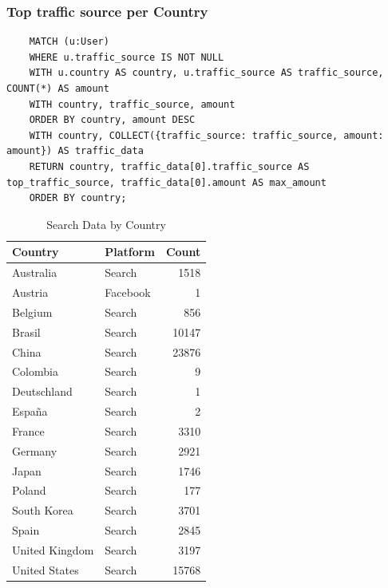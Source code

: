 \documentclass[a4paper,12pt]{article}
\begin{document}
  \subsubsection{Top traffic source per Country}
  \begin{verbatim}
    MATCH (u:User)
    WHERE u.traffic_source IS NOT NULL
    WITH u.country AS country, u.traffic_source AS traffic_source, COUNT(*) AS amount
    WITH country, traffic_source, amount
    ORDER BY country, amount DESC
    WITH country, COLLECT({traffic_source: traffic_source, amount: amount}) AS traffic_data
    RETURN country, traffic_data[0].traffic_source AS top_traffic_source, traffic_data[0].amount AS max_amount
    ORDER BY country;
  \end{verbatim}  

  \begin{table}[h!]
    \centering
    \caption{Search Data by Country}
    \label{tab:search_data}
    \begin{tabular}{l l r}
        \toprule
        \textbf{Country} & \textbf{Platform} & \textbf{Count} \\
        \midrule
        Australia       & Search & 1518 \\
        Austria         & Facebook & 1 \\
        Belgium         & Search & 856 \\
        Brasil          & Search & 10147 \\
        China           & Search & 23876 \\
        Colombia        & Search & 9 \\
        Deutschland     & Search & 1 \\
        España          & Search & 2 \\
        France          & Search & 3310 \\
        Germany         & Search & 2921 \\
        Japan           & Search & 1746 \\
        Poland          & Search & 177 \\
        South Korea     & Search & 3701 \\
        Spain           & Search & 2845 \\
        United Kingdom  & Search & 3197 \\
        United States   & Search & 15768 \\
        \bottomrule
    \end{tabular}
\end{table}
\end{document}
